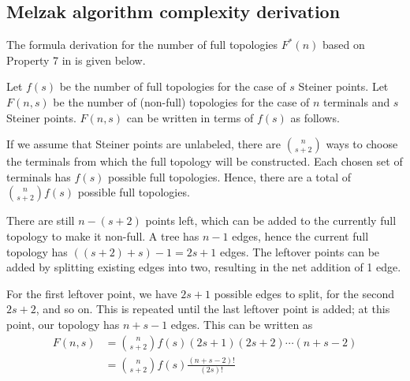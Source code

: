\documentclass{l4proj}
\begin{document}
\begin{appendices}

    \chapter{Melzak algorithm complexity derivation}
    \label{app:melzak_complexity}

    The formula derivation for the number of full topologies $F^*(n)$ based on Property 7 in \cite{Gilbert1968SteinerMT} is given below.

    Let $f(s)$ be the number of full topologies for the case of $s$ Steiner points.
    Let $F(n, s)$ be the number of (non-full) topologies for the case of $n$ terminals and $s$ Steiner points. $F(n, s)$ can be written in terms of $f(s)$ as follows.

    If we assume that Steiner points are unlabeled, there are $\binom{n}{s+2}$ ways to choose the terminals from which the full topology will be constructed. Each chosen set of terminals has $f(s)$ possible full topologies. Hence, there are a total of $\binom {n}{s+2}f(s)$ possible full topologies.

    There are still $n - (s + 2)$ points left, which can be added to the currently full topology to make it non-full. A tree has $n - 1$ edges, hence the current full topology has $((s + 2) + s) - 1 = 2s + 1$ edges. The leftover points can be added by splitting existing edges into two, resulting in the net addition of 1 edge.

    For the first leftover point, we have $2s + 1$ possible edges to split, for the second $2s + 2$, and so on. This is repeated until the last leftover point is added; at this point, our topology has $n + s - 1$ edges. This can be written as
    \begin{equation*}
        \begin{aligned}
            F(n, s) & = \binom{n}{s+2}f(s)(2s + 1)(2s + 2)\cdots(n + s - 2) \\
                    & = \binom{n}{s+2}f(s)\frac{(n + s - 2)!}{(2s)!}
        \end{aligned}
    \end{equation*}


\end{appendices}
\end{document}
